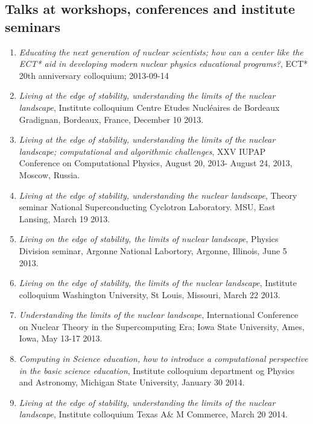 \documentclass[prc,amsart,english,twocolumn,superscriptaddress,showpacs,floatfix]{revtex4}
\begin{document}
 \subsection*{Talks at workshops, conferences and institute seminars}
\begin{enumerate}
\item 
{\em Educating the next generation of nuclear scientists; how can a center like the ECT* aid in developing modern nuclear physics educational programs?}, ECT* 20th anniversary colloquium; 2013-09-14 

\item
{\em Living at the edge of stability, understanding the limits of the nuclear landscape}, Institute colloquium Centre Etudes Nucléaires de Bordeaux Gradignan, Bordeaux, France, December 10 2013.

 
\item
{\em Living at the edge of stability, understanding the limits of the nuclear landscape; computational and algorithmic challenges}, XXV IUPAP Conference on Computational Physics, August 20, 2013- August 24, 2013, Moscow, Russia.

 
\item 
{\em Living at the edge of stability, understanding the nuclear landscape},  Theory seminar National Superconducting Cyclotron Laboratory. MSU, East Lansing, March 19 2013.

 

\item 
{\em Living on the edge of stability, the limits of nuclear landscape}, Physics Division seminar, Argonne National Labortory, Argonne, Illinois, June 5 2013.
 

\item 
{\em  Living on the edge of stability, the limits of the nuclear landscape}, Institute colloquium Washington University, St Louis, Missouri, March 22 2013.
 

\item 
{\em  Understanding the limits of the nuclear landscape}, International Conference on Nuclear Theory in the Supercomputing Era; Iowa State University, Ames, Iowa, May 13-17 2013.

\item
{\em Computing in Science education, how to introduce a computational perspective in the basic science education}, Institute colloquium department og Physics and Astronomy, Michigan State University, January 30 2014.

\item
{\em Living at the edge of stability, understanding the limits of the nuclear landscape}, Institute colloquium Texas A\& M Commerce, March 20 2014.


\end{enumerate}
\end{document}
